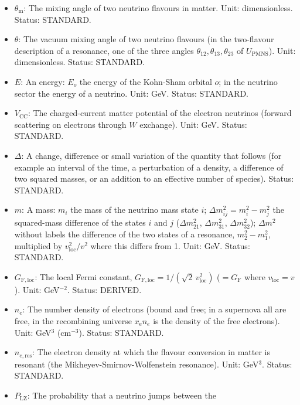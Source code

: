 \documentclass[
  10pt,
]{article}
\providecommand{\tightlist}{%
  \setlength{\itemsep}{0pt}\setlength{\parskip}{0pt}}
\begin{document}
\begin{itemize}
\tightlist
\item
  \(\theta_{\mathrm{m}}\): The mixing angle of two neutrino flavours in
  matter. Unit: dimensionless. Status: STANDARD.
\item
  \(\theta\): The vacuum mixing angle of two neutrino flavours (in the
  two-flavour description of a resonance, one of the three angles
  \(\theta_{12}, \theta_{13}, \theta_{23}\) of \(U_{\mathrm{PMNS}}\)).
  Unit: dimensionless. Status: STANDARD.
\item
  \(E\): An energy: \(E_o\) the energy of the Kohn-Sham orbital \(o\);
  in the neutrino sector the energy of a neutrino. Unit: GeV. Status:
  STANDARD.
\item
  \(V_{\mathrm{CC}}\): The charged-current matter potential of the
  electron neutrinos (forward scattering on electrons through \(W\)
  exchange). Unit: GeV. Status: STANDARD.
\item
  \(\Delta\): A change, difference or small variation of the quantity
  that follows (for example an interval of the time, a perturbation of a
  density, a difference of two squared masses, or an addition to an
  effective number of species). Status: STANDARD.
\item
  \(m\): A mass: \(m_i\) the mass of the neutrino mass state \(i\);
  \(\Delta m_{ij}^2 = m_i^2 - m_j^2\) the squared-mass difference of the
  states \(i\) and \(j\) (\(\Delta m_{21}^2\), \(\Delta m_{31}^2\),
  \(\Delta m_{32}^2\)); \(\Delta m^2\) without labels the difference of
  the two states of a resonance, \(m_2^2 - m_1^2\), multiplied by
  \(v_{\mathrm{loc}}^2/v^2\) where this differs from 1. Unit: GeV.
  Status: STANDARD.
\item
  \(G_{\mathrm{F,loc}}\): The local Fermi constant,
  \(G_{\mathrm{F,loc}} = 1/(\sqrt2\,v_{\mathrm{loc}}^2)\)
  (\(= G_{\mathrm{F}}\) where \(v_{\mathrm{loc}} = v\)). Unit:
  GeV\(^{-2}\). Status: DERIVED.
\item
  \(n_e\): The number density of electrons (bound and free; in a
  supernova all are free, in the recombining universe
  \(x_{\mathrm{e}}n_e\) is the density of the free electrons). Unit:
  GeV\(^3\) (cm\(^{-3}\)). Status: STANDARD.
\item
  \(n_{e,\mathrm{res}}\): The electron density at which the flavour
  conversion in matter is resonant (the Mikheyev-Smirnov-Wolfenstein
  resonance). Unit: GeV\(^3\). Status: STANDARD.
\item
  \(P_{\mathrm{LZ}}\): The probability that a neutrino jumps between the

\end{itemize}
\end{document}

